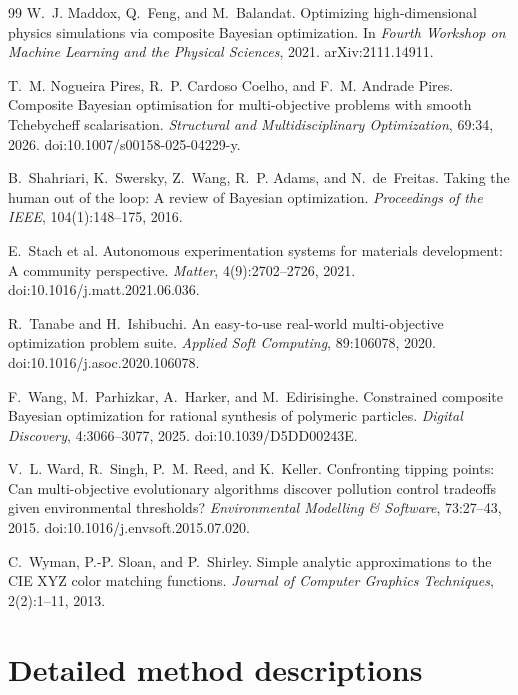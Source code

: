 \documentclass{article}
\begin{document}
\begin{thebibliography}{99}
W.~J. Maddox, Q.~Feng, and M.~Balandat.
Optimizing high-dimensional physics simulations via composite Bayesian optimization.
In \emph{Fourth Workshop on Machine Learning and the Physical Sciences}, 2021.
arXiv:2111.14911.

T.~M. Nogueira Pires, R.~P. Cardoso Coelho, and F.~M. Andrade Pires.
Composite Bayesian optimisation for multi-objective problems with smooth
Tchebycheff scalarisation.
\emph{Structural and Multidisciplinary Optimization}, 69:34, 2026.
doi:10.1007/s00158-025-04229-y.

B.~Shahriari, K.~Swersky, Z.~Wang, R.~P. Adams, and N.~de~Freitas.
Taking the human out of the loop: A review of Bayesian optimization.
\emph{Proceedings of the IEEE}, 104(1):148--175, 2016.

E.~Stach et al.
Autonomous experimentation systems for materials development: A community perspective.
\emph{Matter}, 4(9):2702--2726, 2021.
doi:10.1016/j.matt.2021.06.036.

R.~Tanabe and H.~Ishibuchi.
An easy-to-use real-world multi-objective optimization problem suite.
\emph{Applied Soft Computing}, 89:106078, 2020.
doi:10.1016/j.asoc.2020.106078.

F.~Wang, M.~Parhizkar, A.~Harker, and M.~Edirisinghe.
Constrained composite Bayesian optimization for rational synthesis of polymeric particles.
\emph{Digital Discovery}, 4:3066--3077, 2025.
doi:10.1039/D5DD00243E.

V.~L. Ward, R.~Singh, P.~M. Reed, and K.~Keller.
Confronting tipping points: Can multi-objective evolutionary algorithms discover
pollution control tradeoffs given environmental thresholds?
\emph{Environmental Modelling \& Software}, 73:27--43, 2015.
doi:10.1016/j.envsoft.2015.07.020.

C.~Wyman, P.-P. Sloan, and P.~Shirley.
Simple analytic approximations to the CIE XYZ color matching functions.
\emph{Journal of Computer Graphics Techniques}, 2(2):1--11, 2013.

\end{thebibliography}

\appendix

\section{Detailed method descriptions}
\label{app:implementation}
\end{document}
